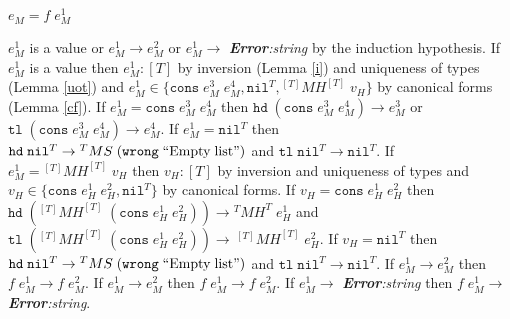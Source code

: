 \begin{case}
$e_{M}=f\;e_{M}^{1}$

$e_{M}^{1}$ is a value or $e_{M}^{1}\rightarrow e_{M}^{2}$ or $e_{M}^{1}\rightarrow$ \emph{\textbf{Error}:\;string} by the induction hypothesis.  If $e_{M}^{1}$ is a value then $e_{M}^{1}:[T]$ by inversion (Lemma \ref{i}) and uniqueness of types (Lemma \ref{uot}) and $e_{M}^{1}\in\lbrace\mathtt{cons}\;e_{M}^{3}\;e_{M}^{4},\mathtt{nil}^{T},{^{[T]}M}H^{[T]}\;v_{H}\rbrace$ by canonical forms (Lemma \ref{cf}).  If $e_{M}^{1}=\mathtt{cons}\;e_{M}^{3}\;e_{M}^{4}$ then $\mathtt{hd}\;(\mathtt{cons}\;e_{M}^{3}\;e_{M}^{4})\rightarrow e_{M}^{3}$ or $\mathtt{tl}\;(\mathtt{cons}\;e_{M}^{3}\;e_{M}^{4})\rightarrow e_{M}^{4}$.  If $e_{M}^{1}=\mathtt{nil}^{T}$ then $\mathtt{hd}\;\mathtt{nil}^{T}\rightarrow{^{T}M}S\;(\mathtt{wrong}\;\mathrm{``Empty\;list"})$ and $\mathtt{tl}\;\mathtt{nil}^{T}\rightarrow\mathtt{nil}^{T}$.  If $e_{M}^{1}={^{[T]}M}H^{[T]}\;v_{H}$ then $v_{H}:[T]$ by inversion and uniqueness of types and $v_{H}\in\lbrace\mathtt{cons}\;e_{H}^{1}\;e_{H}^{2},\mathtt{nil}^{T}\rbrace$ by canonical forms.  If $v_{H}=\mathtt{cons}\;e_{H}^{1}\;e_{H}^{2}$ then $\mathtt{hd}\;(^{[T]}MH^{[T]}\;(\mathtt{cons}\;e_{H}^{1}\;e_{H}^{2}))\rightarrow{^{T}M}H^{T}\;e_{H}^{1}$ and $\mathtt{tl}\;(^{[T]}MH^{[T]}\;(\mathtt{cons}\;e_{H}^{1}\;e_{H}^{2}))\rightarrow\,^{[T]}MH^{[T]}\;e_{H}^{2}$.  If $v_{H}=\mathtt{nil}^{T}$ then $\mathtt{hd}\;\mathtt{nil}^{T}\rightarrow{^{T}M}S\;(\mathtt{wrong}\;\mathrm{``Empty\;list"})$ and $\mathtt{tl}\;\mathtt{nil}^{T}\rightarrow\mathtt{nil}^{T}$.  If $e_{M}^{1}\rightarrow e_{M}^{2}$ then $f\;e_{M}^{1}\rightarrow f\;e_{M}^{2}$.  If $e_{M}^{1}\rightarrow e_{M}^{2}$ then $f\;e_{M}^{1}\rightarrow f\;e_{M}^{2}$.  If $e_{M}^{1}\rightarrow$ \emph{\textbf{Error}:\;string} then $f\;e_{M}^{1}\rightarrow$ \emph{\textbf{Error}:\;string}.
\end{case}